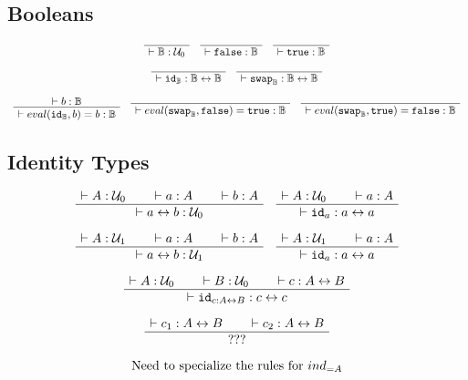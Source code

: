 \documentclass[format=acmlarge,review,natbib]{acmart}
\newcommand{\evalone}[2]{eval(#1,#2)}
\newcommand{\idc}{\mathtt{id}}
\newcommand{\swapc}{\mathtt{swap}}
\newcommand{\iso}{\leftrightarrow}
\newcommand{\fc}{\mathtt{false}}
\newcommand{\tc}{\mathtt{true}}
\newcommand{\boolt}{\mathbb{B}}
\newcommand{\uzero}{\mathcal{U}_0}
\newcommand{\uone}{\mathcal{U}_1}
\newcommand{\proves}{\vdash}
\newcommand{\jdg}[3]{#1 \proves #2 : #3}
\begin{document}
\subsection{Booleans}

\[
  \begin{array}{c}
    \AxiomC{}
    \UnaryInfC{$\jdg{}{\boolt}{\uzero}$}
    \DisplayProof
    \quad
    \AxiomC{}
    \UnaryInfC{$\jdg{}{\fc}{\boolt}$}
    \DisplayProof
    \quad
    \AxiomC{}
    \UnaryInfC{$\jdg{}{\tc}{\boolt}$}
    \DisplayProof
    \\
    \\
    \AxiomC{}
    \UnaryInfC{$\jdg{}{\idc_{\boolt}}{\boolt\iso\boolt}$}
    \DisplayProof
    \quad
    \AxiomC{}
    \UnaryInfC{$\jdg{}{\swapc_{\boolt}}{\boolt\iso\boolt}$}
    \DisplayProof
    \\
    \\
    \AxiomC{$\jdg{}{b}{\boolt}$}
    \UnaryInfC{$\jdg{}{\evalone{\idc_{\boolt}}{b} = b}{\boolt}$}
    \DisplayProof
    \quad
    \AxiomC{}
    \UnaryInfC{$\jdg{}{\evalone{\swapc_{\boolt}}{\fc} = \tc}{\boolt}$}
    \DisplayProof
    \quad
    \AxiomC{}
    \UnaryInfC{$\jdg{}{\evalone{\swapc_{\boolt}}{\tc} = \fc}{\boolt}$}
    \DisplayProof
  \end{array}
\]

\subsection{Identity Types}

\[
  \begin{array}{c}
    \AxiomC{$\jdg{}{A}{\uzero}$}
    \AxiomC{$\jdg{}{a}{A}$}
    \AxiomC{$\jdg{}{b}{A}$}
    \TrinaryInfC{$\jdg{}{a \iso b}{\uzero}$}
    \DisplayProof
    \quad
    \AxiomC{$\jdg{}{A}{\uzero}$}
    \AxiomC{$\jdg{}{a}{A}$}
    \BinaryInfC{$\jdg{}{\idc_{a}}{a \iso a}$}
    \DisplayProof
    \\
    \\
    \AxiomC{$\jdg{}{A}{\uone}$}
    \AxiomC{$\jdg{}{a}{A}$}
    \AxiomC{$\jdg{}{b}{A}$}
    \TrinaryInfC{$\jdg{}{a \iso b}{\uone}$}
    \DisplayProof
    \quad
    \AxiomC{$\jdg{}{A}{\uone}$}
    \AxiomC{$\jdg{}{a}{A}$}
    \BinaryInfC{$\jdg{}{\idc_{a}}{a \iso a}$}
    \DisplayProof
    \\
    \\
    \AxiomC{$\jdg{}{A}{\uzero}$}
    \AxiomC{$\jdg{}{B}{\uzero}$}
    \AxiomC{$\jdg{}{c}{A \iso B}$}
    \TrinaryInfC{$\jdg{}{\idc_{c:A\iso B}}{c \iso c}$}
    \DisplayProof
    \\
    \\
    \AxiomC{$\jdg{}{c_1}{A \iso B}$}
    \AxiomC{$\jdg{}{c_2}{A \iso B}$}
    \BinaryInfC{$???$}
    \DisplayProof
    \\
    \\
    \mbox{Need to specialize the rules for } ind_{=A}
  \end{array}
\]
\end{document}
